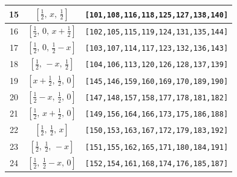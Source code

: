 \documentclass[fleqn,8pt]{jsarticle}
\begin{document}
\begin{longtable}{ccc}
15 & $\left[ \frac{1}{2},\, x,\, \frac{1}{2} \right]$ & {\tt [101,108,116,118,125,127,138,140]} \\ \hline
16 & $\left[ \frac{1}{2},\, 0,\, x + \frac{1}{2} \right]$ & {\tt [102,105,115,119,124,131,135,144]} \\ \hline
17 & $\left[ \frac{1}{2},\, 0,\, \frac{1}{2} - x \right]$ & {\tt [103,107,114,117,123,132,136,143]} \\ \hline
18 & $\left[ \frac{1}{2},\, - x,\, \frac{1}{2} \right]$ & {\tt [104,106,113,120,126,128,137,139]} \\ \hline
19 & $\left[ x + \frac{1}{2},\, \frac{1}{2},\, 0 \right]$ & {\tt [145,146,159,160,169,170,189,190]} \\ \hline
20 & $\left[ \frac{1}{2} - x,\, \frac{1}{2},\, 0 \right]$ & {\tt [147,148,157,158,177,178,181,182]} \\ \hline
21 & $\left[ \frac{1}{2},\, x + \frac{1}{2},\, 0 \right]$ & {\tt [149,156,164,166,173,175,186,188]} \\ \hline
22 & $\left[ \frac{1}{2},\, \frac{1}{2},\, x \right]$ & {\tt [150,153,163,167,172,179,183,192]} \\ \hline
23 & $\left[ \frac{1}{2},\, \frac{1}{2},\, - x \right]$ & {\tt [151,155,162,165,171,180,184,191]} \\ \hline
24 & $\left[ \frac{1}{2},\, \frac{1}{2} - x,\, 0 \right]$ & {\tt [152,154,161,168,174,176,185,187]} \\
\end{longtable}
\renewcommand{\arraystretch}{1.2}
\end{document}
